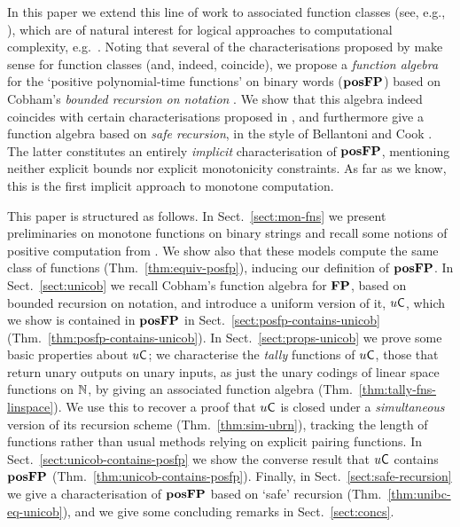 \documentclass{lmcs}
\begin{document}
In this paper we extend this line of work to associated function classes (see, e.g., \cite{CloKra02}), which are of natural interest for logical approaches to computational complexity, e.g.\ \cite{Buss1986,Cook:2010:LFP:1734064}.
Noting that several of the characterisations proposed by \cite{LautemannSS96:on-pos-p} make sense for function classes (and, indeed, coincide), we propose a \emph{function algebra} for the `positive polynomial-time functions' on binary words ($\mathbf{pos}\mathbf{FP}$) based on Cobham's \emph{bounded recursion on notation} \cite{Cobham}.
We show that this algebra indeed coincides with certain characterisations proposed in \cite{LautemannSS96:on-pos-p}, and furthermore give a function algebra based on \emph{safe recursion}, in the style of Bellantoni and Cook \cite{BelCoo92}. The latter constitutes an entirely \emph{implicit} characterisation of $\mathbf{pos}\mathbf{FP}$, mentioning neither explicit bounds nor explicit monotonicity constraints.
As far as we know, this is the first implicit approach to monotone computation.

This paper is structured as follows. In Sect.~\ref{sect:mon-fns} we present preliminaries on monotone functions on binary strings and recall some notions of positive computation from \cite{LautemannSS96:on-pos-p,LSS98}. We show also that these models compute the same class of functions (Thm.~\ref{thm:equiv-posfp}), inducing our definition of $\mathbf{pos}\mathbf{FP}$.
In Sect.~\ref{sect:unicob} we recall Cobham's function algebra for $\mathbf{FP}$, based on bounded recursion on notation, and introduce a uniform version of it, $u \mathsf{C}$, which we show is contained in $\mathbf{pos}\mathbf{FP}$ in Sect.~\ref{sect:posfp-contains-unicob} (Thm.~\ref{thm:posfp-contains-unicob}).
In Sect.~\ref{sect:props-unicob} we prove some basic properties about $u \mathsf{C}$; we characterise the \emph{tally} functions of $u \mathsf{C}$, those that return unary outputs on unary inputs, as just the unary codings of linear space functions on $\mathbb{N}$, by giving an associated function algebra (Thm.~\ref{thm:tally-fns-linspace}). 
We use this to recover a proof that $u \mathsf{C}$ is closed under a \emph{simultaneous} version of its recursion scheme (Thm.~\ref{thm:sim-ubrn}), tracking the length of functions rather than usual methods relying on explicit pairing functions.
In Sect.~\ref{sect:unicob-contains-posfp} we show the converse result that $u \mathsf{C}$ contains $\mathbf{pos}\mathbf{FP}$ (Thm.~\ref{thm:unicob-contains-posfp}).
Finally, in Sect.~\ref{sect:safe-recursion} we give a characterisation of $\mathbf{pos}\mathbf{FP}$ based on `safe' recursion  (Thm.~\ref{thm:unibc-eq-unicob}), and we give some concluding remarks in Sect.~\ref{sect:concs}.
\end{document}
